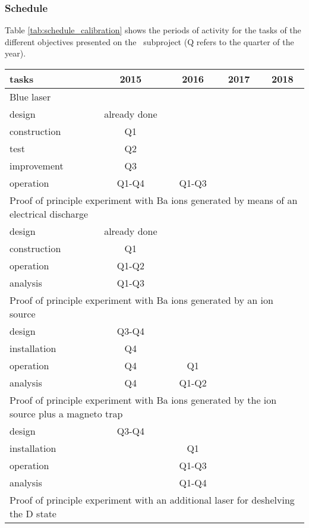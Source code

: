 

\subsubsection*{Schedule}

Table \ref{tab:schedule_calibration} shows the periods of activity for the tasks of the different objectives presented on the  \BATA\ subproject (Q refers to the quarter of the year).

\begin{center}
\begin{tabular}{| l | c | c | c | c |}
\hline
tasks & 2015 & 2016 & 2017 & 2018 \\
\hline
\hline
\multicolumn{5}{|l|}{Blue laser}  \\
\hline
\hline
design & already done & & &  \\
construction & Q1 & & & \\
test & Q2 & & & \\
improvement  & Q3 & & & \\
operation &  Q1-Q4 & Q1-Q3 & & \\
\hline
\hline
\multicolumn{5}{|l|}{Proof of principle experiment with Ba ions generated by means of an electrical discharge}  \\
\hline
\hline
design & already done & & &  \\
construction  &  Q1 & & & \\
operation &  Q1-Q2 & & & \\
analysis &  Q1-Q3 & & & \\
\hline
\hline
\multicolumn{5}{|l|}{Proof of principle experiment with Ba ions generated by an ion source}  \\
\hline
\hline
design & Q3-Q4 & & &  \\
installation  &  Q4 & & & \\
operation &  Q4 & Q1 & & \\
analysis &  Q4 & Q1-Q2 & & \\
\hline
\hline
\multicolumn{5}{|l|}{Proof of principle experiment with Ba ions generated by the ion source plus a magneto trap}  \\
\hline
\hline
design & Q3-Q4 & & &  \\
installation  &  & Q1 & & \\
operation &  & Q1-Q3 & & \\
analysis &  & Q1-Q4 & & \\
\hline
\hline
\multicolumn{5}{|l|}{Proof of principle experiment with an additional laser for deshelving the D state}  \\

\end{tabular}
\end{center}
